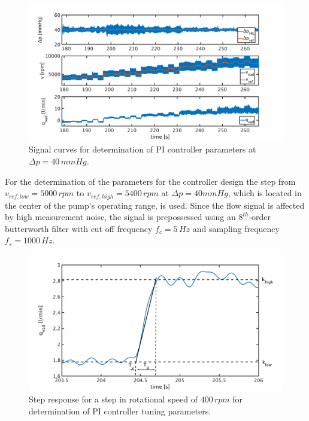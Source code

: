 \begin{figure}[ht]
  \centering
  \includegraphics[width=\textwidth]{images/chapt_5/dyn_meas_40.pdf}
  \caption[Signal curves for determination of PI controller parameters at $\Delta{p}=40\,mmHg$]{Signal curves for determination of PI controller parameters at $\Delta{p}=40\,mmHg$.}
  \label{fig:dyn_meas_40}
\end{figure}
For the determination of the parameters for the controller design the step from $v_{ref,low}=5000\, rpm$ to $v_{ref,high}=5400\, rpm$ at $\Delta{p}=40mmHg$, which is located in the center of the pump's operating range, is used.
Since the flow signal is affected by high measurement noise, the signal is prepossessed using an $8^{th}$-order butterworth filter with cut off frequency $f_c=5\,Hz$ and sampling frequency $f_s=1000\,Hz$.
\begin{figure}[ht]
  \centering
  \includegraphics[width=\textwidth]{images/chapt_5/param_calc_PI.pdf}
  \caption[Step response for determination of PI controller tuning parameters]{Step response for a step in rotational speed of $400\,rpm$ for determination of PI controller tuning parameters.}
  \label{fig:param_calc_PI}
\end{figure}
